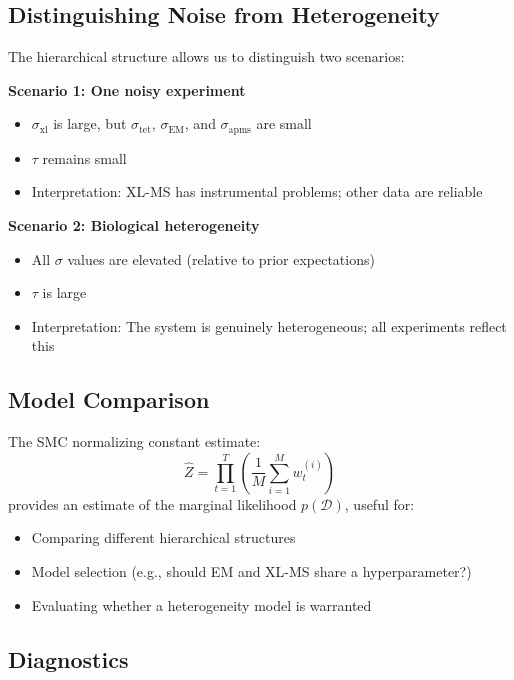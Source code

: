 \documentclass[11pt,a4paper]{article}
\theoremstyle{definition}
\begin{document}
\subsection{Distinguishing Noise from Heterogeneity}

The hierarchical structure allows us to distinguish two scenarios:

\textbf{Scenario 1: One noisy experiment}
\begin{itemize}
    \item $\sigma_{\text{xl}}$ is large, but $\sigma_{\text{tet}}$, $\sigma_{\text{EM}}$, and $\sigma_{\text{apms}}$ are small
    \item $\tau$ remains small
    \item Interpretation: XL-MS has instrumental problems; other data are reliable
\end{itemize}

\textbf{Scenario 2: Biological heterogeneity}
\begin{itemize}
    \item All $\sigma$ values are elevated (relative to prior expectations)
    \item $\tau$ is large
    \item Interpretation: The system is genuinely heterogeneous; all experiments reflect this
\end{itemize}

\subsection{Model Comparison}

The SMC normalizing constant estimate:
\begin{equation}
    \hat{Z} = \prod_{t=1}^{T} \left( \frac{1}{M} \sum_{i=1}^{M} w_t^{(i)} \right)
\end{equation}
provides an estimate of the marginal likelihood $p(\mathcal{D})$, useful for:
\begin{itemize}
    \item Comparing different hierarchical structures
    \item Model selection (e.g., should EM and XL-MS share a hyperparameter?)
    \item Evaluating whether a heterogeneity model is warranted
\end{itemize}

\subsection{Diagnostics}
\end{document}
